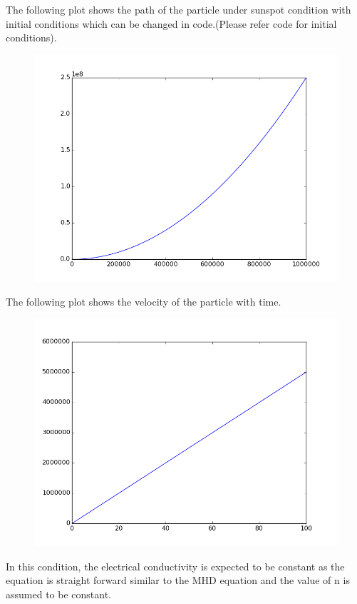 \documentclass[11pt, a4paper]{article}
\begin{document}
The following plot shows the path of the particle under sunspot condition with initial conditions which can be changed in code.(Please refer code for initial conditions).
\begin{figure}[H]
 \centering
 \includegraphics[width = \textwidth]{q2c_path.png}
\end{figure}
The following plot shows the velocity of the particle with time.
\begin{figure}[H]
\centering
\includegraphics[width = \textwidth]{q2c_vel.png}
\end{figure}

In this condition, the electrical conductivity is expected to be constant as the equation is straight forward similar to the MHD equation and the value of n is assumed to be constant. 
\end{document}
